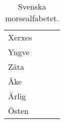 \begin{table}[H]
\begin{tabular}{llll}
	Xerxes  & \MXerxes  &                       &                \\
	Yngve   & \MYngve   &                       &                \\
	Zäta    & \MZata    &                       &                \\
	Åke     & \MAke     &                       &                \\
	Ärlig   & \MArlig   &                       &                \\
	Östen   & \MOsten   &
\end{tabular}
\normalsize
\caption{Svenska morsealfabetet.}
\label{tab:morsealfabetet}
\end{table}




